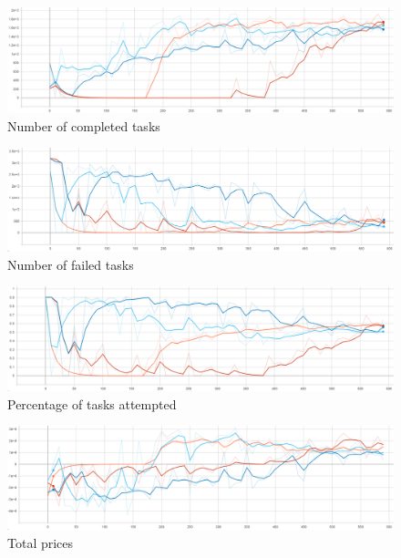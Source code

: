 \begin{figure}[H]
    \centering
    \includegraphics[width=\linewidth]{figures/4_test_eval_figs/env_training_fig/num_completed_tasks.png}
    \caption{Number of completed tasks}
    \label{fig:env_num_completed_tasks}
\end{figure}

\begin{figure}[H]
    \centering
    \includegraphics[width=\linewidth]{figures/4_test_eval_figs/env_training_fig/num_failed_tasks.png}
    \caption{Number of failed tasks}
    \label{fig:env_num_failed_tasks}
\end{figure}

\begin{figure}[H]
    \centering
    \includegraphics[width=\linewidth]{figures/4_test_eval_figs/env_training_fig/percent_tasks.png}
    \caption{Percentage of tasks attempted}
    \label{fig:env_percent_tasks}
\end{figure}

\begin{figure}[H]
    \centering
    \includegraphics[width=\linewidth]{figures/4_test_eval_figs/env_training_fig/total_prices.png}
    \caption{Total prices}
    \label{fig:env_total_prices}
\end{figure}

